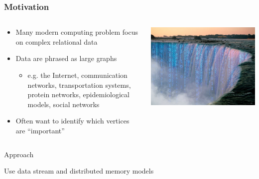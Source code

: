 \documentclass{beamer}
\begin{document}

\begin{frame}
\frametitle{Motivation}


\begin{columns}
	\begin{column}{0.55\textwidth}
		\begin{itemize}
			\item Many modern computing problem focus on complex relational data
			\item Data are phrased as large graphs
			\begin{itemize}
				\item e.g. the Internet, communication networks, transportation systems, protein networks, epidemiological models, social networks
			\end{itemize}
			\item Often want to identify which vertices are ``important''
		\end{itemize}
	\end{column}
	\begin{column}{0.45\textwidth}  %
		\begin{center}
			\includegraphics[width=1.0\textwidth]{bigdata}
		\end{center}
	\end{column}
\end{columns}

\begin{block}{\centering Approach}
	\begin{center}
		Use data stream and distributed memory models
	\end{center}
\end{block}

\end{frame}
\end{document}
